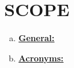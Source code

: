 \section{SCOPE}



\begin{enumerate}[(a)]
	\item \textbf{\underline{General:}} 
	\item \textbf{\underline{Acronyms:}}
\end{enumerate}

